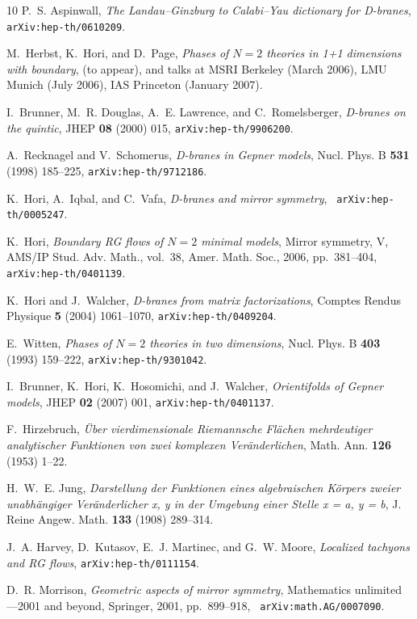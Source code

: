\begin{thebibliography}{10}
P.~S. Aspinwall, {\em The {L}andau--{G}inzburg to {C}alabi--{Y}au dictionary
  for {D}-branes}, {\tt arXiv:hep-th/0610209}.

M.~Herbst, K.~Hori, and D.~Page, {\em Phases of {$N=2$} theories in 1+1
  dimensions with boundary}, (to appear), and talks at MSRI Berkeley (March
  2006), LMU Munich (July 2006), IAS Princeton (January 2007).

I.~Brunner, M.~R. Douglas, A.~E. Lawrence, and C.~Romelsberger, {\em D-branes
  on the quintic}, JHEP {\bf 08} (2000) 015, {\tt arXiv:hep-th/9906200}.

A.~Recknagel and V.~Schomerus, {\em D-branes in {G}epner models}, Nucl. Phys. B
  {\bf 531} (1998) 185--225, {\tt arXiv:hep-th/9712186}.

K.~Hori, A.~Iqbal, and C.~Vafa, {\em D-branes and mirror symmetry}, {\tt
  arXiv:hep-th/0005247}.

K.~Hori, {\em Boundary {RG} flows of {$N=2$} minimal models}, Mirror symmetry,
  V, AMS/IP Stud. Adv. Math., vol.~38, Amer. Math. Soc., 2006, pp.~381--404,
  {\tt arXiv:hep-th/0401139}.

K.~Hori and J.~Walcher, {\em D-branes from matrix factorizations}, Comptes
  Rendus Physique {\bf 5} (2004) 1061--1070, {\tt arXiv:hep-th/0409204}.

E.~Witten, {\em Phases of {$N = 2$} theories in two dimensions}, Nucl. Phys. B
  {\bf 403} (1993) 159--222, {\tt arXiv:hep-th/9301042}.

I.~Brunner, K.~Hori, K.~Hosomichi, and J.~Walcher, {\em Orientifolds of
  {G}epner models}, JHEP {\bf 02} (2007) 001, {\tt arXiv:hep-th/0401137}.

F.~Hirzebruch, {\em \"{U}ber vierdimensionale {R}iemannsche {F}l\"achen
  mehrdeutiger analytischer {F}unktionen von zwei komplexen
  {V}er\"anderlichen}, Math. Ann. {\bf 126} (1953) 1--22.

H.~W.~E. Jung, {\em Darstellung der {F}unktionen eines algebraischen
  {K}{\"o}rpers zweier unabh{\"a}ngiger {V}er{\"a}nderlicher x, y in der
  {U}mgebung einer {S}telle x = a, y = b}, J. Reine Angew. Math. {\bf 133}
  (1908) 289--314.

J.~A. Harvey, D.~Kutasov, E.~J. Martinec, and G.~W. Moore, {\em Localized
  tachyons and {RG} flows}, {\tt arXiv:hep-th/0111154}.

D.~R. Morrison, {\em Geometric aspects of mirror symmetry}, Mathematics
  unlimited---2001 and beyond, Springer, 2001, pp.~899--918, {\tt
  arXiv:math.AG/0007090}.

\end{thebibliography}



